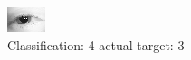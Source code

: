 \begin{figure}[h!]
\begin{center}
\includegraphics[width=0.60\columnwidth]{figures/ID16_class_4_target_3.png}
\end{center}
\caption{ Classification: 4 actual target: 3}
\label{fig:ID16_class_4_target_3}
\end{figure}
